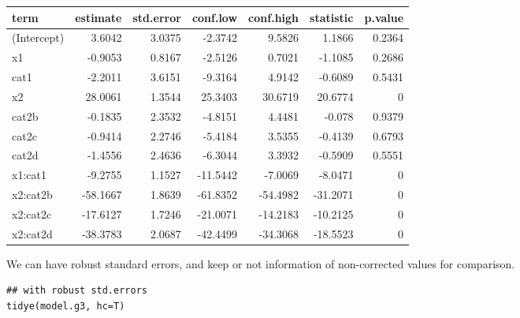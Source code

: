 \documentclass[a4paper]{article}
\begin{document}
\begin{center}
\begin{tabular}{lrrrrrr}
term & estimate & std.error & conf.low & conf.high & statistic & p.value\\
\hline
(Intercept) & 3.6042 & 3.0375 & -2.3742 & 9.5826 & 1.1866 & 0.2364\\
x1 & -0.9053 & 0.8167 & -2.5126 & 0.7021 & -1.1085 & 0.2686\\
cat1 & -2.2011 & 3.6151 & -9.3164 & 4.9142 & -0.6089 & 0.5431\\
x2 & 28.0061 & 1.3544 & 25.3403 & 30.6719 & 20.6774 & 0\\
cat2b & -0.1835 & 2.3532 & -4.8151 & 4.4481 & -0.078 & 0.9379\\
cat2c & -0.9414 & 2.2746 & -5.4184 & 3.5355 & -0.4139 & 0.6793\\
cat2d & -1.4556 & 2.4636 & -6.3044 & 3.3932 & -0.5909 & 0.5551\\
x1:cat1 & -9.2755 & 1.1527 & -11.5442 & -7.0069 & -8.0471 & 0\\
x2:cat2b & -58.1667 & 1.8639 & -61.8352 & -54.4982 & -31.2071 & 0\\
x2:cat2c & -17.6127 & 1.7246 & -21.0071 & -14.2183 & -10.2125 & 0\\
x2:cat2d & -38.3783 & 2.0687 & -42.4499 & -34.3068 & -18.5523 & 0\\
\end{tabular}
\end{center}

We can have robust standard errors, and keep or not information of non-corrected values for comparison.

\lstset{numbers=left,language=r,label= ,caption= ,captionpos=b}
\begin{lstlisting}
## with robust std.errors
tidye(model.g3, hc=T)

\end{lstlisting}
\end{document}
